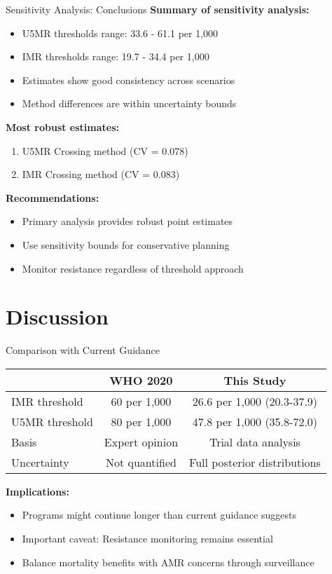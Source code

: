 \documentclass[aspectratio=169]{beamer}\usepackage[]{graphicx}\usepackage[dvipsnames]{xcolor}
\begin{document}
\begin{frame}{Sensitivity Analysis: Conclusions}
\textbf{Summary of sensitivity analysis:}\begin{itemize}\item U5MR thresholds range: 33.6 - 61.1 per 1,000\item IMR thresholds range: 19.7 - 34.4 per 1,000\item Estimates show good consistency across scenarios\item Method differences are within uncertainty bounds\end{itemize}\vspace{0.3cm}\textbf{Most robust estimates:}\begin{enumerate}\item U5MR Crossing method (CV = 0.078)\item IMR Crossing method (CV = 0.083)\end{enumerate}

\vspace{0.3cm}
\textbf{Recommendations:}
\begin{itemize}
  \item Primary analysis provides robust point estimates
  \item Use sensitivity bounds for conservative planning
  \item Monitor resistance regardless of threshold approach
\end{itemize}
\end{frame}

\section{Discussion}

\begin{frame}{Comparison with Current Guidance}
\begin{center}
\begin{tabular}{lcc}
\toprule
& \textbf{WHO 2020} & \textbf{This Study} \\
\midrule
IMR threshold & 60 per 1,000 & 26.6 per 1,000 (20.3-37.9) \\
U5MR threshold & 80 per 1,000 & 47.8 per 1,000 (35.8-72.0) \\
Basis & Expert opinion & Trial data analysis \\
Uncertainty & Not quantified & Full posterior distributions \\
\bottomrule
\end{tabular}
\end{center}

\vspace{0.5cm}
\textbf{Implications:}
\begin{itemize}
  \item Programs might continue longer than current guidance suggests
  \item Important caveat: Resistance monitoring remains essential
  \item Balance mortality benefits with AMR concerns through surveillance
\end{itemize}
\end{frame}
\end{document}
